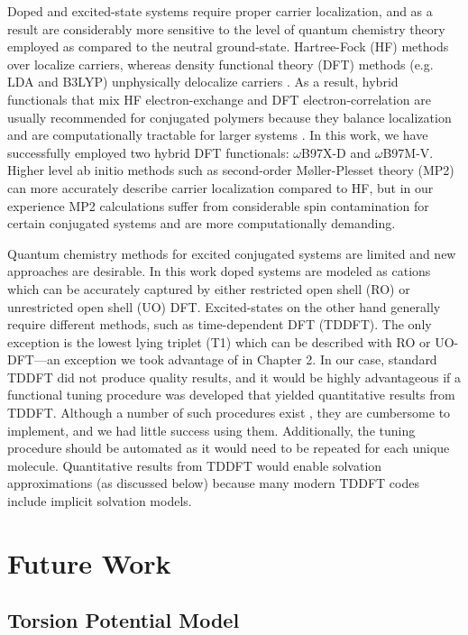 Doped and excited-state systems require proper carrier localization, and as a result are considerably more sensitive to the level of quantum chemistry theory employed as compared to the neutral ground-state. Hartree-Fock (HF) methods over localize carriers, whereas density functional theory (DFT) methods (e.g. LDA and B3LYP) unphysically delocalize carriers \cite{Vlcek2016}. As a result, hybrid functionals that mix HF electron-exchange and DFT electron-correlation are usually recommended for conjugated polymers because they balance localization and are computationally tractable for larger systems \cite{Salzner2011, Salzner2014}. In this work, we have successfully employed two hybrid DFT functionals: $\omega$B97X-D and $\omega$B97M-V. Higher level ab initio methods such as second-order M\o ller-Plesset theory (MP2) can more accurately describe carrier localization compared to HF, but in our experience MP2 calculations suffer from considerable spin contamination for certain conjugated systems and are more computationally demanding.

Quantum chemistry methods for excited conjugated systems are limited and new approaches are desirable. In this work doped systems are modeled as cations which can be accurately captured by either restricted open shell (RO) or unrestricted open shell (UO) DFT. Excited-states on the other hand generally require different methods, such as time-dependent DFT (TDDFT). The only exception is the lowest lying triplet (T1) which can be described with RO or UO-DFT---an exception we took advantage of in Chapter 2. In our case, standard TDDFT did not produce quality results, and it would be highly advantageous if a functional tuning procedure was developed that yielded quantitative results from TDDFT. Although a number of such procedures exist \cite{Korzdorfer2014, Lin2019}, they are cumbersome to implement, and we had little success using them. Additionally, the tuning procedure should be automated as it would need to be repeated for each unique molecule. Quantitative results from TDDFT would enable solvation approximations (as discussed below) because many modern TDDFT codes include implicit solvation models.

\section{Future Work}

\subsection{Torsion Potential Model}


